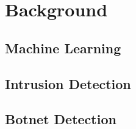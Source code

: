\section{Background}
\blindtext
\subsection*{Machine Learning}
\blindtext
\subsection*{Intrusion Detection}
\blindtext
\subsection*{Botnet Detection}
\blindtext

